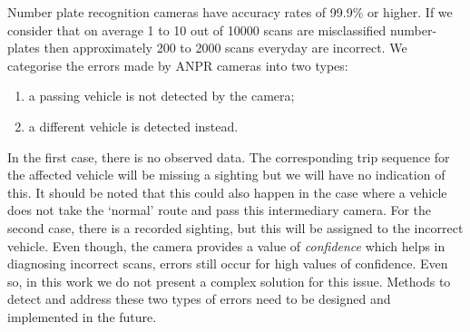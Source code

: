 Number plate recognition cameras have accuracy rates of 99.9\% or higher. If we consider that on average 1 to 10 out of 10000 scans are misclassified number-plates then approximately 200 to 2000 scans everyday are incorrect. We categorise the errors made by ANPR cameras into two types:
\begin{enumerate}
  \item a passing vehicle is not detected by the camera;
  \item a different vehicle is detected instead.
\end{enumerate}
In the first case, there is no observed data. The corresponding trip sequence for the affected vehicle will be missing a sighting but we will have no indication of this. It should be noted that this could also happen in the case where a vehicle does not take the `normal' route and pass this intermediary camera. For the second case, there is a recorded sighting, but this will be assigned to the incorrect vehicle. Even though, the camera provides a value of \emph{confidence} which helps in diagnosing incorrect scans, errors still occur for high values of confidence. Even so, in this work we do not present a complex solution for this issue. Methods to detect and address these two types of errors need to be designed and implemented in the future.
